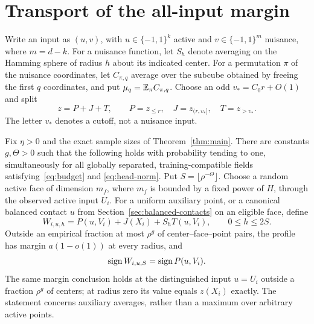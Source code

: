 \section{Transport of the all-input margin}\label{sec:transport}
Write an input as $(u,v)$, with $u\in\{-1,1\}^k$ active and
$v\in\{-1,1\}^{m}$ nuisance, where $m=d-k$. For a nuisance function, let $S_h$
denote averaging on the Hamming sphere of radius $h$ about its indicated
center. For a permutation $\pi$ of the nuisance coordinates, let
$C_{\pi,q}$ average over the subcube obtained by freeing the first $q$
coordinates, and put $\mu_q=\mathbb E_\pi C_{\pi,q}$.
Choose an odd $v_*=C_0r+O(1)$ and split
\[
 z=P+J+T,\qquad P=z_{\le r},\quad J=z_{(r,v_*]},\quad T=z_{>v_*}.
\]
The letter $v_*$ denotes a cutoff, not a nuisance input.

\begin{lemma}\label{lem:effective-profile}
Fix $\eta>0$ and the exact sample sizes of Theorem~\ref{thm:main}.
There are constants $g,\Theta>0$ such that the following holds with
probability tending to one, simultaneously for all globally separated,
training-compatible fields satisfying~\eqref{eq:budget} and
\eqref{eq:head-norm}. Put $S=\lfloor\rho^{-\Theta}\rfloor$.
Choose a random active face of dimension $m_f$, where $m_f$ is bounded
by a fixed power of $H$, through the observed active input $U_i$.
For a uniform auxiliary point, or a canonical balanced contact $u$
from Section~\ref{sec:balanced-contacts} on an eligible face, define
\[
 W_{i,u,h}=P(u,V_i)+J(X_i)+S_hT(u,V_i),\qquad0\le h\le2S.
\]
Outside an empirical fraction at most $\rho^g$ of center--face--point
pairs, the profile has margin $a(1-o(1))$ at every radius, and
\[
 \operatorname{sign} W_{i,u,S}=\operatorname{sign} P(u,V_i).
\]
The same margin conclusion holds at the distinguished input $u=U_i$
outside a fraction $\rho^g$ of centers; at radius zero its value equals
$z(X_i)$ exactly. The statement concerns auxiliary averages, rather
than a maximum over arbitrary active points.
\end{lemma}

